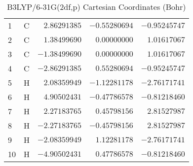 \documentclass[10pt,oneside]{article}
\begin{document}
\begin{table}[h!]
\centering
\caption{B3LYP/6-31G(2df,p) Cartesian Coordinates (Bohr)}
\begin{tabular}{llrrr}
1  & C  & $ 2.86291385$ & $-0.55280694$ & $-0.95245747$ \\
2  & C  & $ 1.38499690$ & $ 0.00000000$ & $ 1.01617067$ \\
3  & C  & $-1.38499690$ & $ 0.00000000$ & $ 1.01617067$ \\
4  & C  & $-2.86291385$ & $ 0.55280694$ & $-0.95245747$ \\
5  & H  & $ 2.08359949$ & $-1.12281178$ & $-2.76171741$ \\
6  & H  & $ 4.90502431$ & $-0.47786578$ & $-0.81218460$ \\
7  & H  & $ 2.27183765$ & $ 0.45798156$ & $ 2.81527987$ \\
8  & H  & $-2.27183765$ & $-0.45798156$ & $ 2.81527987$ \\
9  & H  & $-2.08359949$ & $ 1.12281178$ & $-2.76171741$ \\
10 & H  & $-4.90502431$ & $ 0.47786578$ & $-0.81218460$ \\
\end{tabular}
\end{table}

\clearpage
\end{document}
